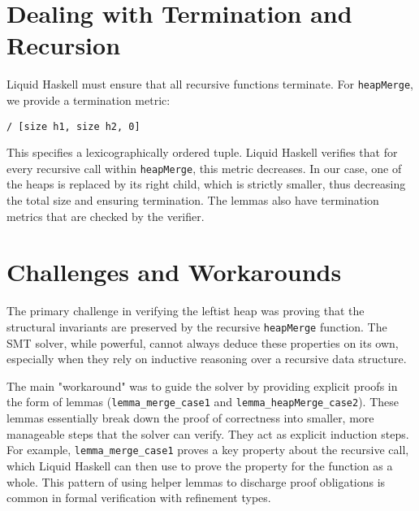 \section{Dealing with Termination and Recursion}
Liquid Haskell must ensure that all recursive functions terminate. For \texttt{heapMerge}, we provide a termination metric:
\begin{verbatim}
/ [size h1, size h2, 0]
\end{verbatim}
This specifies a lexicographically ordered tuple. Liquid Haskell verifies that for every recursive call within \texttt{heapMerge}, this metric decreases. In our case, one of the heaps is replaced by its right child, which is strictly smaller, thus decreasing the total size and ensuring termination. The lemmas also have termination metrics that are checked by the verifier.

\section{Challenges and Workarounds}
The primary challenge in verifying the leftist heap was proving that the structural invariants are preserved by the recursive \texttt{heapMerge} function. The SMT solver, while powerful, cannot always deduce these properties on its own, especially when they rely on inductive reasoning over a recursive data structure.

The main "workaround" was to guide the solver by providing explicit proofs in the form of lemmas (\texttt{lemma\_merge\_case1} and \texttt{lemma\_heapMerge\_case2}). These lemmas essentially break down the proof of correctness into smaller, more manageable steps that the solver can verify. They act as explicit induction steps. For example, \texttt{lemma\_merge\_case1} proves a key property about the recursive call, which Liquid Haskell can then use to prove the property for the function as a whole. This pattern of using helper lemmas to discharge proof obligations is common in formal verification with refinement types.

